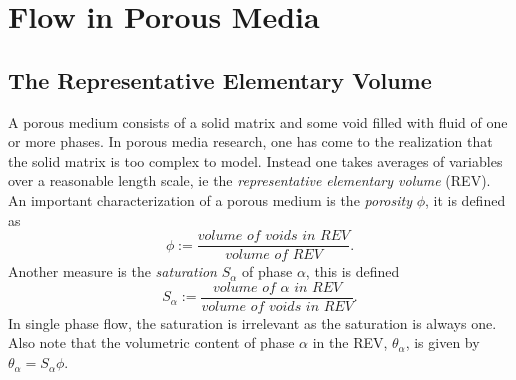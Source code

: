 \documentclass[../Main/main.tex]{subfiles}
\begin{document}
\graphicspath{{../Flow in porous media/figs/}}
\chapter{Flow in Porous Media}
\section*{The Representative Elementary Volume}\label{REV}
A porous medium consists of a solid matrix and some void filled with fluid of one or more phases. In porous media research, one has come to the realization that the solid matrix is too complex to model. Instead one takes averages of variables over a reasonable length scale, ie the \emph{representative elementary volume} (REV).
An important characterization of a porous medium is the \emph{porosity} $\phi$, it is defined as 
\begin{equation}
	\phi := \frac{\textit{volume of voids in REV}}{\textit{volume of REV}}.
\end{equation}
Another measure is the \emph{saturation} $S_{\alpha}$ of phase $\alpha$,  this is defined 
\begin{equation}
	S_{\alpha} := \frac{\textit{volume of }\alpha \textit{ in REV}}{\textit{volume of voids in REV}}.
\end{equation}
In single phase flow, the saturation is irrelevant as the saturation is always one. Also note that the volumetric content of phase $\alpha$ in the REV, $\theta_{\alpha}$, is given by $\theta_{\alpha} = S_{\alpha} \phi$.
\end{document}
